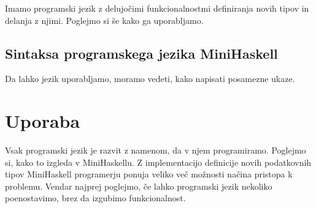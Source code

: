 \documentclass[12pt,a4paper,openany]{book}
\begin{document}
Imamo programski jezik z delujočimi funkcionalnostmi definiranja novih tipov in delanja z njimi. Poglejmo si še kako ga uporabljamo.

\section{Sintaksa programskega jezika MiniHaskell}
Da lahko jezik uporabljamo, moramo vedeti, kako napisati posamezne ukaze. 

\chapter{Uporaba}
Vsak programski jezik je razvit z namenom, da v njem programiramo. Poglejmo si, kako to izgleda v MiniHaskellu. Z implementacijo definicije novih podatkovnih tipov MiniHaskell programerju 
ponuja veliko več možnosti načina pristopa k problemu. Vendar najprej poglejmo, če lahko programski jezik nekoliko poenostavimo, brez da izgubimo funkcionalnost. 
\end{document}
